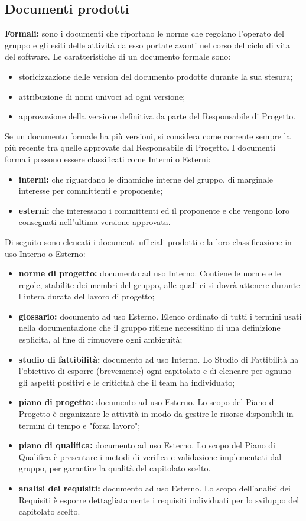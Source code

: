 \subsection{Documenti prodotti}\label{3.1.5}
	 \textbf{Formali:} sono i documenti che riportano le norme che regolano l’operato del gruppo e gli esiti delle attività da esso portate avanti nel corso del ciclo di vita del software. Le caratteristiche di un documento formale sono:
\begin{itemize}
\item storicizzazione delle version del documento prodotte durante la sua stesura;
	\item attribuzione di nomi univoci ad ogni versione;
		\item approvazione della versione definitiva da parte del Responsabile di Progetto.
\end{itemize}
Se un documento formale ha più versioni, si considera come corrente sempre la più recente tra quelle approvate dal Responsabile di Progetto. I documenti formali possono essere classificati come Interni o Esterni:
\begin{itemize}
\item \textbf {interni:} che riguardano le dinamiche interne del gruppo, di marginale interesse per committenti e proponente;
	\item \textbf {esterni:}  che interessano i committenti ed il proponente e che vengono loro consegnati nell’ultima versione approvata.
\end{itemize}
Di seguito sono elencati i documenti ufficiali prodotti e la loro classificazione in uso Interno o Esterno:
\begin{itemize}
\item \textbf{norme di progetto:} documento ad uso Interno. Contiene le norme e le regole, stabilite dei membri del gruppo, alle quali ci si dovrà attenere durante l intera durata del lavoro di progetto;
	\item \textbf{glossario:} documento ad uso Esterno. Elenco ordinato di tutti i termini usati nella documentazione che il gruppo ritiene necessitino di una definizione esplicita, al fine di rimuovere ogni ambiguità;
		\item \textbf{studio di fattibilità:} documento ad uso Interno. Lo Studio di Fattibilità ha l’obiettivo di esporre (brevemente) ogni capitolato e di elencare per ognuno gli aspetti positivi e le criticitaà che il team ha individuato;
			\item \textbf{piano di progetto:} documento ad uso Esterno. Lo scopo del Piano di Progetto è organizzare le attività in modo da gestire le risorse disponibili in termini di tempo e "forza lavoro";
				\item \textbf{piano di qualifica:} documento ad uso Esterno. Lo scopo del Piano di Qualifica è presentare i metodi di verifica e validazione implementati dal gruppo, per garantire la qualità del capitolato scelto.
					\item \textbf{analisi dei requisiti:} documento ad uso Esterno. Lo scopo dell'analisi dei Requisiti è esporre dettagliatamente i requisiti individuati per lo sviluppo del capitolato scelto.
\end{itemize}
